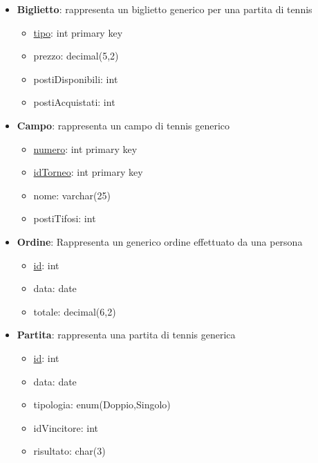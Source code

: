 \documentclass[10pt]{article}
\begin{document}
\begin{itemize}
    \item \textbf{Biglietto}: rappresenta un biglietto generico per una partita di tennis
    \begin{itemize}
        \item \underline{tipo}: int primary key
        \item prezzo: decimal(5,2)
        \item postiDisponibili: int
        \item postiAcquistati: int
    \end{itemize}
    
    \item \textbf{Campo}: rappresenta un campo di tennis generico
    \begin{itemize}
        \item \underline{numero}: int primary key
        \item \underline{idTorneo}: int primary key
        \item nome: varchar(25)
        \item postiTifosi: int
    \end{itemize}
    
    \item \textbf{Ordine}: Rappresenta un generico ordine effettuato da una persona
    \begin{itemize}
        \item \underline{id}: int
        \item data: date
        \item totale: decimal(6,2)
    \end{itemize}
    
    \item \textbf{Partita}: rappresenta una partita di tennis generica
    \begin{itemize}
        \item \underline{id}: int
        \item data: date
        \item tipologia: enum(Doppio,Singolo)
        \item idVincitore: int
        \item risultato: char(3)
    \end{itemize}
    

\end{itemize}
\end{document}
